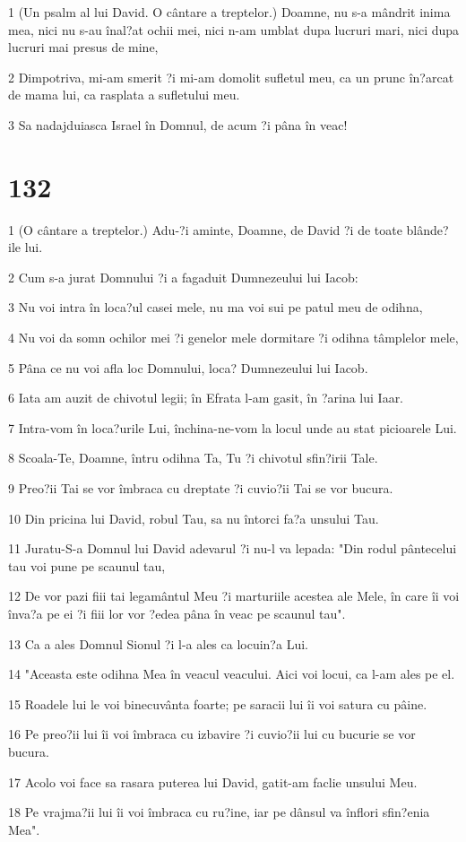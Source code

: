 \par 1 (Un psalm al lui David. O cântare a treptelor.) Doamne, nu s-a mândrit inima mea, nici nu s-au înal?at ochii mei, nici n-am umblat dupa lucruri mari, nici dupa lucruri mai presus de mine,
\par 2 Dimpotriva, mi-am smerit ?i mi-am domolit sufletul meu, ca un prunc în?arcat de mama lui, ca rasplata a sufletului meu.
\par 3 Sa nadajduiasca Israel în Domnul, de acum ?i pâna în veac!

\chapter{132}

\par 1 (O cântare a treptelor.) Adu-?i aminte, Doamne, de David ?i de toate blânde?ile lui.
\par 2 Cum s-a jurat Domnului ?i a fagaduit Dumnezeului lui Iacob:
\par 3 Nu voi intra în loca?ul casei mele, nu ma voi sui pe patul meu de odihna,
\par 4 Nu voi da somn ochilor mei ?i genelor mele dormitare ?i odihna tâmplelor mele,
\par 5 Pâna ce nu voi afla loc Domnului, loca? Dumnezeului lui Iacob.
\par 6 Iata am auzit de chivotul legii; în Efrata l-am gasit, în ?arina lui Iaar.
\par 7 Intra-vom în loca?urile Lui, închina-ne-vom la locul unde au stat picioarele Lui.
\par 8 Scoala-Te, Doamne, întru odihna Ta, Tu ?i chivotul sfin?irii Tale.
\par 9 Preo?ii Tai se vor îmbraca cu dreptate ?i cuvio?ii Tai se vor bucura.
\par 10 Din pricina lui David, robul Tau, sa nu întorci fa?a unsului Tau.
\par 11 Juratu-S-a Domnul lui David adevarul ?i nu-l va lepada: "Din rodul pântecelui tau voi pune pe scaunul tau,
\par 12 De vor pazi fiii tai legamântul Meu ?i marturiile acestea ale Mele, în care îi voi înva?a pe ei ?i fiii lor vor ?edea pâna în veac pe scaunul tau".
\par 13 Ca a ales Domnul Sionul ?i l-a ales ca locuin?a Lui.
\par 14 "Aceasta este odihna Mea în veacul veacului. Aici voi locui, ca l-am ales pe el.
\par 15 Roadele lui le voi binecuvânta foarte; pe saracii lui îi voi satura cu pâine.
\par 16 Pe preo?ii lui îi voi îmbraca cu izbavire ?i cuvio?ii lui cu bucurie se vor bucura.
\par 17 Acolo voi face sa rasara puterea lui David, gatit-am faclie unsului Meu.
\par 18 Pe vrajma?ii lui îi voi îmbraca cu ru?ine, iar pe dânsul va înflori sfin?enia Mea".

